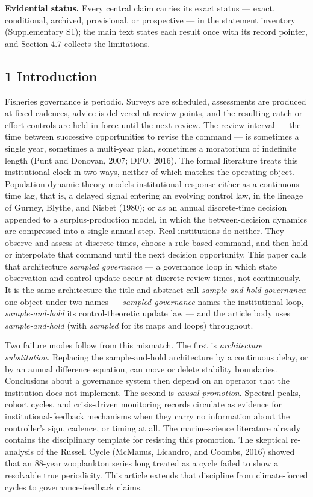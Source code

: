 \documentclass[11pt]{article}
\begin{document}
\textbf{Evidential status.} Every central claim carries its exact status --- exact, conditional, archived, provisional, or prospective --- in the statement inventory (Supplementary S1); the main text states each result once with its record pointer, and Section 4.7 collects the limitations.

\subsection{1 Introduction}\label{introduction}

Fisheries governance is periodic. Surveys are scheduled, assessments are
produced at fixed cadences, advice is delivered at review points, and
the resulting catch or effort controls are held in force until the next
review. The review interval --- the time between successive
opportunities to revise the command --- is sometimes a single year,
sometimes a multi-year plan, sometimes a moratorium of indefinite length
(Punt and Donovan, 2007; DFO, 2016). The formal literature treats this
institutional clock in two ways, neither of which matches the operating
object. Population-dynamic theory models institutional response either
as a continuous-time lag, that is, a delayed signal entering an evolving
control law, in the lineage of Gurney, Blythe, and Nisbet (1980); or as
an annual discrete-time decision appended to a surplus-production model,
in which the between-decision dynamics are compressed into a single
annual step. Real institutions do neither. They observe and assess at
discrete times, choose a rule-based command, and then hold or
interpolate that command until the next decision opportunity. This paper
calls that architecture \emph{sampled governance} --- a governance loop
in which state observation and control update occur at discrete review
times, not continuously. It is the same architecture the title and abstract call \emph{sample-and-hold
governance}: one object under two names --- \emph{sampled governance}
names the institutional loop, \emph{sample-and-hold} its
control-theoretic update law --- and the article body uses
\emph{sample-and-hold} (with \emph{sampled} for its maps and loops)
throughout.

Two failure modes follow from this mismatch. The first is
\emph{architecture substitution}. Replacing the sample-and-hold
architecture by a continuous delay, or by an annual difference equation,
can move or delete stability boundaries. Conclusions about a governance
system then depend on an operator that the institution does not
implement. The second is \emph{causal promotion}. Spectral peaks, cohort
cycles, and crisis-driven monitoring records circulate as evidence for
institutional-feedback mechanisms when they carry no information about
the controller's sign, cadence, or timing at all. The marine-science
literature already contains the disciplinary template for resisting this
promotion. The skeptical re-analysis of the Russell Cycle (McManus,
Licandro, and Coombs, 2016) showed that an 88-year zooplankton series
long treated as a cycle failed to show a resolvable true periodicity.
This article extends that discipline from climate-forced cycles to
governance-feedback claims.
\end{document}
